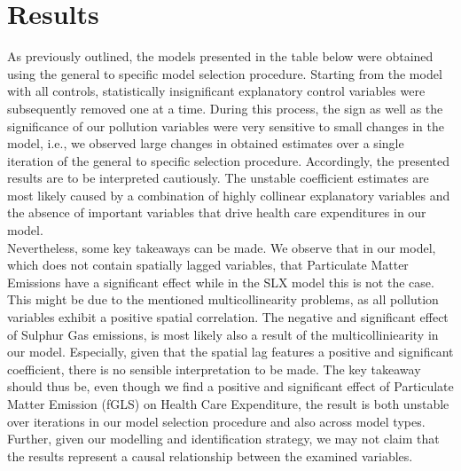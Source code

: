\documentclass[
]{article}
\begin{document}
\section{Results}
As previously outlined, the models presented in the table below were obtained using the general to specific model selection procedure. Starting from the model with all controls, statistically insignificant explanatory control variables were subsequently removed one at a time. During this process, the sign as well as the significance of our pollution variables were very sensitive to small changes in the model, i.e., we observed large changes in obtained estimates over a single iteration of the general to specific selection procedure. Accordingly, the presented results are to be interpreted cautiously. The unstable coefficient estimates are most likely caused by a combination of highly collinear explanatory variables and the absence of important variables that drive health care expenditures in our model.\\ Nevertheless, some key takeaways can be made. We observe that in our model, which does not contain spatially lagged variables, that Particulate Matter Emissions have a significant effect while in the SLX model this is not the case. This might be due to the mentioned multicollinearity problems, as all pollution variables exhibit a positive spatial correlation. The negative and significant effect of Sulphur Gas emissions, is most likely also a result of the multicolliniearity in our model. Especially, given that the spatial lag features a positive and significant coefficient, there is no sensible interpretation to be made. The key takeaway should thus be, even though we find a positive and significant effect of Particulate Matter Emission (fGLS) on Health Care Expenditure, the result is both unstable over iterations in our model selection procedure and also across model types. Further, given our modelling and identification strategy, we may not claim that the results represent a causal relationship between the examined variables.
\end{document}
